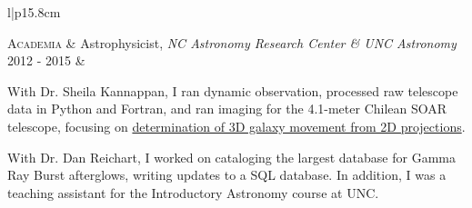 \documentclass[a4paper, 9pt]{article} %
\begin{document}
\begin{tabular}{l|p{15.8cm}}

\textsc{Academia} & Astrophysicist, \emph{NC Astronomy Research Center \& UNC Astronomy}\\
\textsc{2012 - 2015} & \begin{minipage}[t]{\linewidth}
\begin{itemize}[nosep, after=\strut, leftmargin=*]
\footnotesize{
\item With Dr. Sheila Kannappan, I ran dynamic observation, processed raw telescope data in Python and Fortran, and ran imaging for the 4.1-meter Chilean SOAR telescope, focusing on \href{https://ui.adsabs.harvard.edu/abs/2015AAS...22533611B/abstract}{determination of 3D galaxy movement from 2D projections}.

\item With Dr. Dan Reichart, I worked on cataloging the largest database for Gamma Ray Burst afterglows, writing updates to a SQL database. In addition, I was a teaching assistant for the Introductory Astronomy course at UNC.

}
\end{itemize}
\end{minipage}
\end{tabular}
\end{document}
